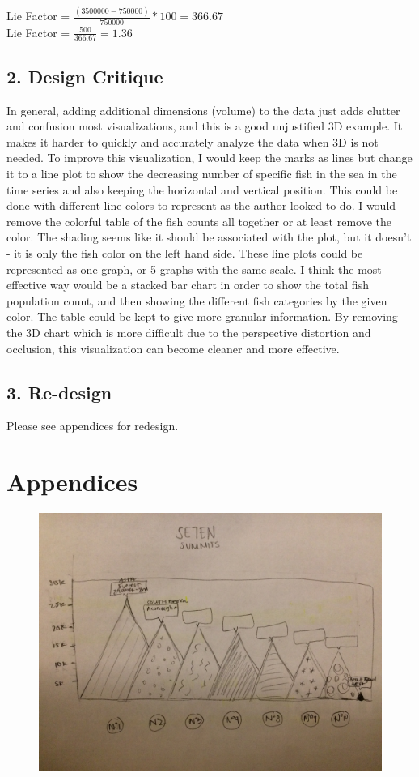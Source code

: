 \documentclass{neu_handout}
\begin{document}
Lie Factor = $ \frac{(3500000 - 750000)}{750000} * 100 = 366.67 $
\\

Lie Factor = $ \frac{500}{366.67} = 1.36 $
\\

\subsection*{2. Design Critique}

In general, adding additional dimensions (volume) to the data just adds clutter and confusion most visualizations, and this is a good unjustified 3D example. It makes it harder to quickly and accurately analyze the data when 3D is not needed. To improve this visualization, I would keep the marks as lines but change it to a line plot to show the decreasing number of specific fish in the sea in the time series and also keeping the horizontal and vertical position. This could be done with different line colors to represent as the author looked to do. I would remove the colorful table of the fish counts all together or at least remove the color. The shading seems like it should be associated with the plot, but it doesn't - it is only the fish color on the left hand side. These line plots could be represented as one graph, or 5 graphs with the same scale. I think the most effective way would be a stacked bar chart in order to show the total fish population count, and then showing the different fish categories by the given color. The table could be kept to give more granular information. By removing the 3D chart which is more difficult due to the perspective distortion and occlusion, this visualization can become cleaner and more effective.


\subsection*{3. Re-design}

Please see appendices for redesign.



\newpage

\appendix
\section{Appendices}

\begin{figure}[h]
\centering
{
\includegraphics[width=0.5\linewidth]{part2_1}
}
\end{figure}
\end{document}
